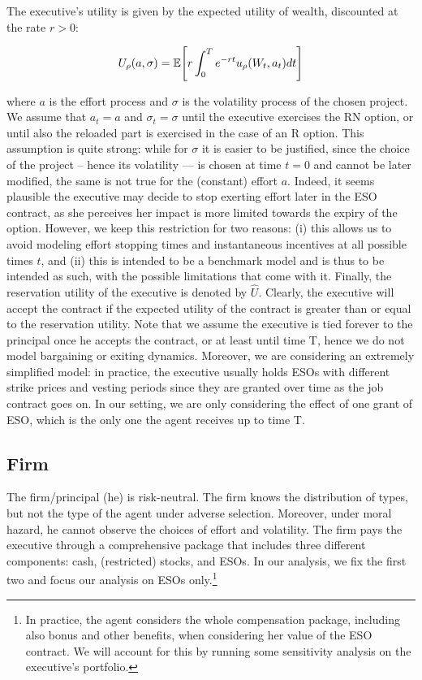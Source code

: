 The executive's utility is given by the expected utility of wealth, discounted at the rate $r>0$:

$$ U_\rho (a, \sigma) = \operatorname{\mathbb{E}} \Biggl[r \int_{0}^{T} e^{-rt} u_\rho (W_t, a_t) dt \Biggr]$$

where $a$ is the effort process and $\sigma$ is the volatility process of the chosen project. We assume that $a_t=a$ and $\sigma_t=\sigma$ until the executive exercises the RN option, or until also the reloaded part is exercised in the case of an R option. This assumption is quite strong: while for $\sigma$ it is easier to be justified, since the choice of the project -- hence its volatility --- is chosen at time $t=0$ and cannot be later modified, the same is not true for the (constant) effort $a$. Indeed, it seems plausible the executive may decide to stop exerting effort later in the ESO contract, as she perceives her impact is more limited towards the expiry of the option. However, we keep this restriction for two reasons: (i) this allows us to avoid modeling effort stopping times and instantaneous incentives at all possible times $t$, and (ii) this is intended to be a benchmark model and is thus to be intended as such, with the possible limitations that come with it. Finally, the reservation utility of the executive is denoted by $\hat{U}$. Clearly, the executive will accept the contract if the expected utility of the contract is greater than or equal to the reservation utility.
Note that we assume the executive is tied forever to the principal once he accepts the contract, or at least until time T, hence we do not model bargaining or exiting dynamics. Moreover, we are considering an extremely simplified model: in practice, the executive usually holds ESOs with different strike prices and vesting periods since they are granted over time as the job contract goes on. In our setting, we are only considering the effect of one grant of ESO, which is the only one the agent receives up to time T. 

\subsection{Firm}
The firm/principal (he) is risk-neutral. The firm knows the distribution of types, but not the type of the agent under adverse selection. Moreover, under moral hazard, he cannot observe the choices of effort and volatility. 
The firm pays the executive through a comprehensive package that includes three different components: cash, (restricted) stocks, and ESOs. In our analysis, we fix the first two and focus our analysis on ESOs only.\footnote{In practice, the agent considers the whole compensation package, including also bonus and other benefits, when considering her value of the ESO contract. We will account for this by running some sensitivity analysis on the executive's portfolio.} 


